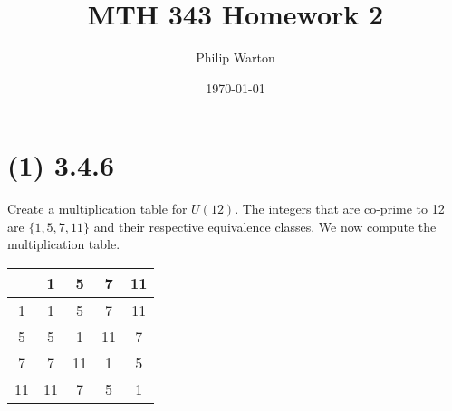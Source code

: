 \documentclass{article}
\begin{document}
\title{MTH 343 Homework 2}
\author{Philip Warton}
\date{\today}
\maketitle
\section*{(1) 3.4.6}
Create a multiplication table for $U(12)$.
The integers that are co-prime to 12 are $\{1, 5, 7, 11\}$ and their respective equivalence classes.
We now compute the multiplication table.
\begin{center}
    \begin{tabular}{ c| c | c | c | c |}
        & 1 & 5 & 7 & 11 \\
       \hline
       1 & 1 & 5 & 7 & 11 \\ 
       \hline
       5 & 5 & 1 & 11 & 7 \\ 
       \hline
       7 & 7 & 11 & 1 & 5 \\ 
       \hline
       11 & 11 & 7 & 5 & 1 \\ 
       \hline
    \end{tabular}
\end{center}
\end{document}
